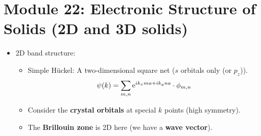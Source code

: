 \documentclass[../notes.tex]{subfiles}
\begin{document}
\section{Module 22: Electronic Structure of Solids (2D and 3D solids)}
\begin{itemize}
    \item 2D band structure:
    \begin{itemize}
        \item Simple H\"{u}ckel: A two-dimensional square net ($s$ orbitals only (or $p_z$)).
        \begin{equation*}
            \psi(k) = \sum_{m,n}\e[ik_xma+ik_yna]\cdot\phi_{m,n}
        \end{equation*}
        \item Consider the \textbf{crystal orbitals} at special $k$ points (high symmetry).
        \item The \textbf{Brillouin zone} is 2D here (we have a \textbf{wave vector}).
        \begin{figure}[h!]
            \centering
\end{figure}
\end{itemize}
\end{itemize}
\end{document}
